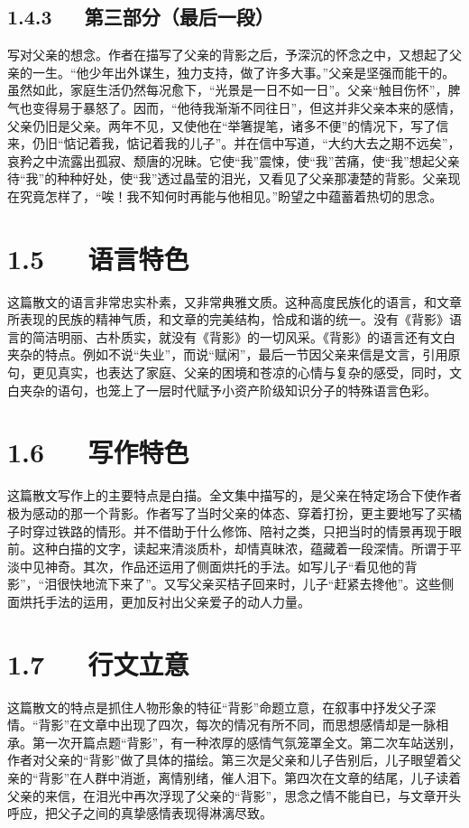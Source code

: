 \documentclass[letterpaper,10pt,english]{sphinxmanual}
\begin{document}
\subsection{1.4.3   第三部分（最后一段）}
\label{\detokenize{p01_u6563_u6587/_u6731_u81ea_u6e05-_u80cc_u5f71:id9}}
写对父亲的想念。作者在描写了父亲的背影之后，予深沉的怀念之中，又想起了父亲的一生。“他少年出外谋生，独力支持，做了许多大事。”父亲是坚强而能干的。虽然如此，家庭生活仍然每况愈下，“光景是一日不如一日”。父亲“触目伤怀”，脾气也变得易于暴怒了。因而，“他待我渐渐不同往日”，但这并非父亲本来的感情，父亲仍旧是父亲。两年不见，又使他在“举箸提笔，诸多不便”的情况下，写了信来，仍旧“惦记着我，惦记着我的儿子”。并在信中写道，“大约大去之期不远矣”，哀矜之中流露出孤寂、颓唐的况昧。它使“我”震悚，使“我”苦痛，使“我”想起父亲待“我”的种种好处，使“我”透过晶莹的泪光，又看见了父亲那凄楚的背影。父亲现在究竟怎样了，“唉！我不知何时再能与他相见。”盼望之中蕴蓄着热切的思念。


\section{1.5   语言特色}
\label{\detokenize{p01_u6563_u6587/_u6731_u81ea_u6e05-_u80cc_u5f71:id10}}
这篇散文的语言非常忠实朴素，又非常典雅文质。这种高度民族化的语言，和文章所表现的民族的精神气质，和文章的完美结构，恰成和谐的统一。没有《背影》语言的简洁明丽、古朴质实，就没有《背影》的一切风采。《背影》的语言还有文白夹杂的特点。例如不说“失业”，而说“赋闲”，最后一节因父亲来信是文言，引用原句，更见真实，也表达了家庭、父亲的困境和苍凉的心情与复杂的感受，同时，文白夹杂的语句，也笼上了一层时代赋予小资产阶级知识分子的特殊语言色彩。


\section{1.6   写作特色}
\label{\detokenize{p01_u6563_u6587/_u6731_u81ea_u6e05-_u80cc_u5f71:id11}}
这篇散文写作上的主要特点是白描。全文集中描写的，是父亲在特定场合下使作者极为感动的那一个背影。作者写了当时父亲的体态、穿着打扮，更主要地写了买橘子时穿过铁路的情形。并不借助于什么修饰、陪衬之类，只把当时的情景再现于眼前。这种白描的文字，读起来清淡质朴，却情真昧浓，蕴藏着一段深情。所谓于平淡中见神奇。其次，作品还运用了侧面烘托的手法。如写儿子“看见他的背影”，“泪很快地流下来了”。又写父亲买桔子回来时，儿子“赶紧去搀他”。这些侧面烘托手法的运用，更加反衬出父亲爱子的动人力量。


\section{1.7   行文立意}
\label{\detokenize{p01_u6563_u6587/_u6731_u81ea_u6e05-_u80cc_u5f71:id12}}
这篇散文的特点是抓住人物形象的特征“背影”命题立意，在叙事中抒发父子深情。“背影”在文章中出现了四次，每次的情况有所不同，而思想感情却是一脉相承。第一次开篇点题“背影”，有一种浓厚的感情气氛笼罩全文。第二次车站送别，作者对父亲的“背影”做了具体的描绘。第三次是父亲和儿子告别后，儿子眼望着父亲的“背影”在人群中消逝，离情别绪，催人泪下。第四次在文章的结尾，儿子读着父亲的来信，在泪光中再次浮现了父亲的“背影”，思念之情不能自已，与文章开头呼应，把父子之间的真挚感情表现得淋漓尽致。
\end{document}
